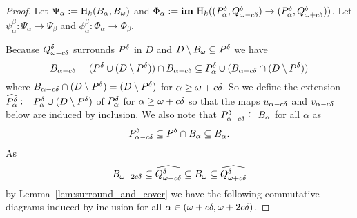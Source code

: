 \begin{proof}
  Let $\Psi_\alpha := \hom_k(B_\alpha, \B)$ and $\Phi_\alpha := \im~\hom_k((\P_\alpha, \Q^\delta)\to (\P_\alpha,\QQ^\delta))$.
  Let $\psi_\alpha^\beta : \Psi_\alpha\to \Psi_\beta$ and $\phi_\alpha^\beta : \Phi_\alpha\to \Phi_\beta$.

  Because $\Q^\delta$ surrounds $\P$ in $D$ and $D\setminus \B\subseteq \P$ we have
  \[ B_{\alpha-c\of} = (\P\cup (D\setminus \P))\cap B_{\alpha -c\of}\subseteq \P_\alpha \cup (B_{\alpha - c\of}\cap (D\setminus \P))\]
  where $B_{\alpha - c\of}\cap (D\setminus \P) = (D\setminus \P)$ for $\alpha\geq \omega+c\of$.
  So we define the extension $\ext{\P_\alpha} := \P_\alpha\cup (D\setminus \P)$ of $\P_\alpha$ for $\alpha\geq\omega+c\of$ so that the maps $u_{\alpha-c\of}$ and $v_{\alpha-c\of}$ below are induced by inclusion.
  We also note that $\P_{\alpha-c\of}\subseteq B_\alpha$ for all $\alpha$ as
  \[ \P_{\alpha-c\of}\subseteq \P\cap B_\alpha\subseteq B_\alpha.\]
  As
  \[ \b\subseteq \ext{\Q^\of}\subseteq \B\subseteq \ext{\QQ^\of} \]
  by Lemma~\ref{lem:surround_and_cover} we have the following commutative diagrams induced by inclusion for all $\alpha\in (\omega+c\of, \omega+2c\of)$.


\end{proof}
